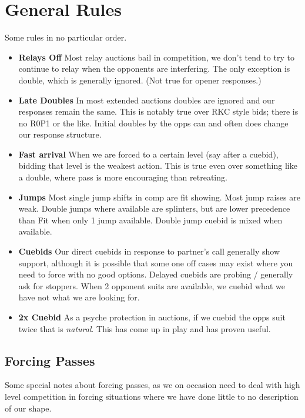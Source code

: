 \documentclass[main]{subfile}
\begin{document}
	
\chapter{General Rules}

Some rules in no particular order.

\begin{itemize}[]
\item \textbf{Relays Off} Most relay auctions bail in competition, we don't tend to try to continue to relay when the opponents are interfering. The only exception is double, which is generally ignored. (Not true for  opener responses.)
\item \textbf{Late Doubles} In most extended auctions doubles are ignored and our responses remain the same. This is notably true over RKC style bids; there is no R0P1 or the like. Initial doubles by the opps can and often does change our response structure.
\item \textbf{Fast arrival} When we are forced to a certain level (say after a cuebid), bidding that level is the weakest action. This is true even over something like a double, where pass is more encouraging than retreating.
\item \textbf{Jumps} Most single jump shifts in comp are fit showing. Most jump raises are weak. Double jumps where available are splinters, but are lower precedence than Fit when only 1 jump available. Double jump cuebid is mixed when available.
\item \textbf{Cuebids} Our direct cuebids in response to partner's call generally show support, although it is possible that some one off cases may exist where you need to force with no good options.  Delayed cuebids are probing / generally ask for stoppers. When 2 opponent suits are available, we cuebid what we have not what we are looking for.
\item \textbf{2x Cuebid} As a psyche protection in  auctions, if we cuebid the opps suit twice that is \textit{natural}. This has come up in play and has proven useful.
\end{itemize}

\section{Forcing Passes}

Some special notes about forcing passes, as we on occasion need to deal with high level competition in forcing situations where we have done little to no description of our shape.
\end{document}
